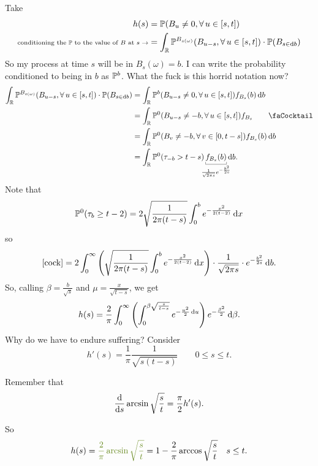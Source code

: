 \documentclass[12pt]{report}
\begin{document}
\begin{fancyproof}
	Take
	\begin{align*}
		h(s)&=\mathbb{P}(B_{u}\neq 0,\forall\, u\in[s,t])\\
		\text{\scriptsize conditioning the $\mathbb{P}$ to the value of $B$ at $s\rightarrow$}&=\int_{\mathbb{R}}\mathbb{P}^{B_{s(\omega)}}(B_{u-s},\forall\, u\in[s,t])\cdot\mathbb{P}(B_{s\in\mathop{}\!\mathrm{d} b})\\
	\end{align*}
	So my process at time $s$ will be in $B_{s}(\omega)=b$. I can write the probability conditioned to being in $b$ as $\mathbb{P}^{b}$. What the fuck is this horrid notation now?
	\begin{align*}
		\int_{\R}\pr^{B_{s(\omega)}}(B_{u-s},\every u\in[s,t])\cdot\pr(B_{s\in\dif b})&=\int_{\R}\pr^{b}(B_{u-s}\neq0,\every u\in[s,t])f_{B_{s}}(b)\dif b\\
		&=\int_{\R}\pr^{0}(B_{u-s}\neq-b,\every u\in[s,t])f_{B_{s}}\tag*{\faCocktail}\label{cock}\\
		&=\int_{\R}\pr^{0}(B_{v}\neq-b,\every v\in[0,t-s])f_{B_{s}}(b)\dif b\\
		&=\int_{\R}\pr^{0}(\tau_{-b}>t-s)\ubracketthin{f_{B_{s}}(b)}_{\mathclap{\frac{1}{\sqrt{2\pi s}}e^{-\frac{b^{2}}{2s}}}}\dif b.
	\end{align*}
	Note that
	\begin{equation*}
		\mathbb{P}^{0}(\tau_{b}\geq t-2)=2\sqrt{\frac{1}{2\pi(t-s)}}\int_{0}^{b}e^{-\frac{x^{2}}{2(t-2)}}\mathop{}\!\mathrm{d} x
	\end{equation*}
	so
	\begin{equation*}
		\eqref{cock}=2\int_{0}^{\infty}\left(\sqrt{\frac{1}{2\pi(t-s)}}\int_{0}^{b}e^{-\frac{x^{2}}{2(t-2)}}\mathop{}\!\mathrm{d} x\right)\cdot\frac{1}{\sqrt{2\pi s}}\cdot e^{-\frac{b^{2}}{2s}}\mathop{}\!\mathrm{d} b.
	\end{equation*}
	So, calling $\beta=\frac{b}{\sqrt{s}}$ and $\mu=\frac{x}{\sqrt{t-s}}$, we get
	\begin{equation*}
		h(s)=\frac{2}{\pi}\int_{0}^{\infty}\left(\int_{0}^{\beta\sqrt{\frac{s}{t-s}}}e^{-\frac{u^{2}}{2}\mathop{}\!\mathrm{d} u}\right)e^{-\frac{\beta^{2}}{2}}\mathop{}\!\mathrm{d}\beta.
	\end{equation*}
	Why do we have to endure suffering? Consider
	\begin{equation*}
		h'(s)=\frac{1}{\pi}\frac{1}{\sqrt{s(t-s)}}\qquad0\leq s\leq t.
	\end{equation*}
	\begin{revise}
		Remember that 
		\begin{equation*}
			\frac{\mathop{}\!\mathrm{d}}{\mathop{}\!\mathrm{d} s}\arcsin\sqrt{\frac{s}{t}} =\frac{\pi}{2}h'(s).
		\end{equation*}
	\end{revise}
	So
	\begin{equation*}
		h(s)=\mathcolor{OliveDrab4}{\frac{2}{\pi}\arcsin\sqrt{\frac{s}{t}}}=1-\frac{2}{\pi}\arccos\sqrt{\frac{s}{t}}\quad s\leq t.
	\end{equation*}
\end{fancyproof}
\end{document}
